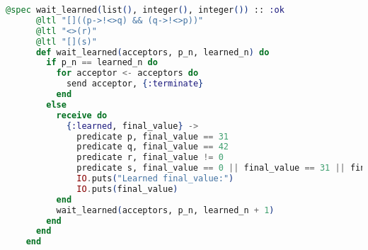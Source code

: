 \begin{lstlisting}[language=Elixir, xleftmargin=.1\linewidth]
      @spec wait_learned(list(), integer(), integer()) :: :ok
      @ltl "[]((p->!<>q) && (q->!<>p))"
      @ltl "<>(r)"
      @ltl "[](s)"
      def wait_learned(acceptors, p_n, learned_n) do
        if p_n == learned_n do
          for acceptor <- acceptors do
            send acceptor, {:terminate}
          end
        else
          receive do
            {:learned, final_value} ->
              predicate p, final_value == 31
              predicate q, final_value == 42
              predicate r, final_value != 0
              predicate s, final_value == 0 || final_value == 31 || final_value == 42
              IO.puts("Learned final_value:")
              IO.puts(final_value)
          end
          wait_learned(acceptors, p_n, learned_n + 1)
        end
      end
    end
\end{lstlisting}

